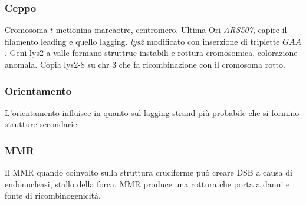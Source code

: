 		\subsubsection{Ceppo}
		Cromosoma $t$ metionina marcaotre, centromero.
		Ultima Ori \emph{ARS507}, capire il filamento leading e quello lagging.
		\emph{lys2} modificato con inserzione di triplette $GAA$.
		Geni lys2 a valle formano struttrue instabili e rottura cromosomica, colorazione anomala.
		Copia lys2-8 su chr 3 che fa ricombinazione con il cromosoma rotto.

		\subsubsection{Orientamento}
		L'orientamento influisce in quanto sul lagging strand pi\`u probabile che si formino strutture secondarie.

		\subsubsection{MMR}
		Il MMR quando coinvolto sulla struttura cruciforme pu\`o creare DSB a causa di endonucleasi, stallo della forca.
		MMR produce una rottura che porta a danni e fonte di ricombinogenicit\`a.

